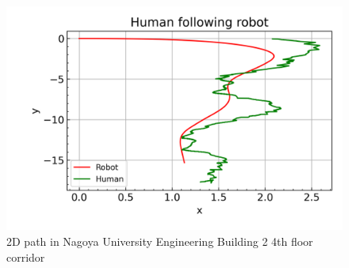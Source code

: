 \begin{figure}[!htb]
    \centering
    \hspace*{-2cm}
    \includegraphics[scale=0.8]{figures/chap4_fig/Results/human_following_robot_corridor_5.png}
    \caption{2D path in Nagoya University Engineering Building 2 4th floor corridor}
    \label{Chap4:Fig8}
\end{figure}


